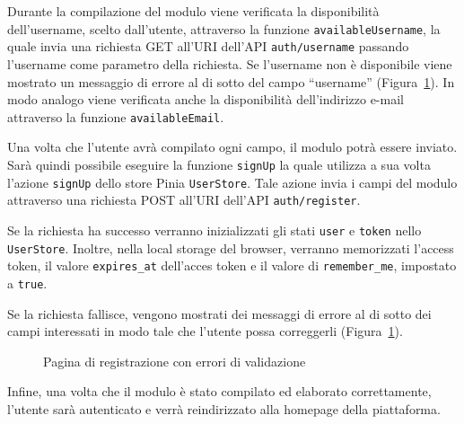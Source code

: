 Durante la compilazione del modulo viene verificata la disponibilit\`a dell'username, scelto dall'utente, attraverso la funzione \verb|availableUsername|, la quale invia una richiesta GET all'URI dell'API \verb|auth/username| passando l'username come parametro della richiesta. Se l'username non \`e disponibile viene mostrato un messaggio di errore al di sotto del campo ``username'' (Figura~\ref{fig:modulo_registrazione_non_valido}). In modo analogo viene verificata anche la disponibilit\`a dell'indirizzo e-mail attraverso la funzione \verb|availableEmail|.

Una volta che l'utente avr\`a compilato ogni campo, il modulo potr\`a essere inviato. Sar\`a quindi possibile eseguire la funzione \verb|signUp| la quale utilizza a sua volta l'azione \verb|signUp| dello store Pinia \verb|UserStore|. Tale azione invia i campi del modulo attraverso una richiesta POST all'URI dell'API \verb|auth/register|.

Se la richiesta ha successo verranno inizializzati gli stati \verb|user| e \verb|token| nello \verb|UserStore|. Inoltre, nella local storage del browser, verranno memorizzati l'access token, il valore \verb|expires_at| dell'acces token e il valore di \verb|remember_me|, impostato a \verb|true|.

Se la richiesta fallisce, vengono mostrati dei messaggi di errore al di sotto dei campi interessati in modo tale che l'utente possa correggerli (Figura~\ref{fig:modulo_registrazione_non_valido}).
\begin{figure}[htbp]
	\centering
	\fboxsep=0.5pt
	\fboxrule=0.5pt
	\caption{Pagina di registrazione con errori di validazione}
	\label{fig:modulo_registrazione_non_valido}
\end{figure}

Infine, una volta che il modulo \`e stato compilato ed elaborato correttamente, l'utente sar\`a autenticato e verr\`a reindirizzato alla homepage della piattaforma.


